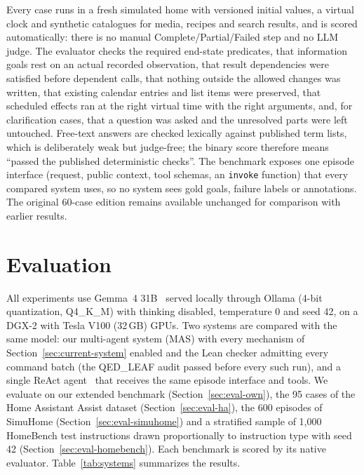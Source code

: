 \documentclass[a4paper,11pt]{article}
\begin{document}
Every case runs in a fresh simulated home with versioned initial values, a virtual clock and
synthetic catalogues for media, recipes and search results, and is scored automatically: there
is no manual Complete/Partial/Failed step and no LLM judge. The evaluator checks the required
end-state predicates, that information goals rest on an actual recorded observation, that result
dependencies were satisfied before dependent calls, that nothing outside the allowed changes was
written, that existing calendar entries and list items were preserved, that scheduled effects
ran at the right virtual time with the right arguments, and, for clarification cases, that a
question was asked and the unresolved parts were left untouched. Free-text answers are checked
lexically against published term lists, which is deliberately weak but judge-free; the binary
score therefore means ``passed the published deterministic checks''. The benchmark exposes one
episode interface (request, public context, tool schemas, an \texttt{invoke} function) that every
compared system uses, so no system sees gold goals, failure labels or annotations. The original
60-case edition remains available unchanged for comparison with earlier results.

\section{Evaluation}
\label{sec:evaluation}

All experiments use Gemma~4 31B~\cite{gemma4} served locally through Ollama (4-bit quantization,
Q4\_K\_M) with thinking disabled, temperature 0 and seed 42, on a DGX-2 with Tesla V100 (32\,GB)
GPUs. Two systems are compared with the same model: our multi-agent system (MAS) with every
mechanism of Section~\ref{sec:current-system} enabled and the Lean checker admitting every
command batch (the QED\_LEAF audit passed before every such run), and a single ReAct
agent~\cite{react} that receives the same episode interface and tools. We evaluate on our
extended benchmark (Section~\ref{sec:eval-own}), the 95 cases of the Home Assistant Assist
dataset (Section~\ref{sec:eval-ha}), the 600 episodes of SimuHome (Section~\ref{sec:eval-simuhome})
and a stratified sample of 1,000 HomeBench test instructions drawn proportionally to instruction
type with seed 42 (Section~\ref{sec:eval-homebench}). Each benchmark is scored by its native
evaluator. Table~\ref{tab:systems} summarizes the results.
\end{document}

